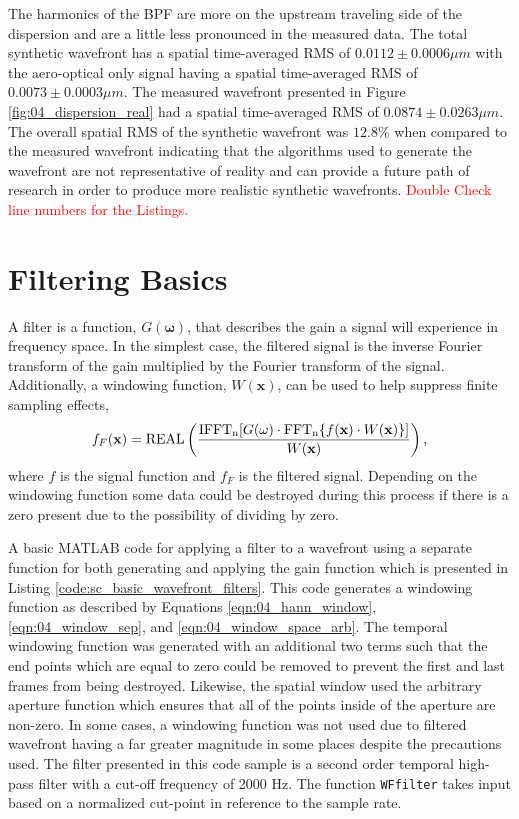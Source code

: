 The harmonics of the BPF are more on the upstream traveling side of the dispersion and are a little less pronounced in the measured data.
The total synthetic wavefront has a spatial time-averaged RMS of $0.0112\pm0.0006\mu m$ with the aero-optical only signal having a spatial time-averaged RMS of $0.0073\pm0.0003\mu m$.
The measured wavefront presented in Figure \ref{fig:04_dispersion_real} had a spatial time-averaged RMS of $0.0874\pm0.0263\mu m$.
The overall spatial RMS of the synthetic wavefront was $12.8\%$ when compared to the measured wavefront indicating that the algorithms used to generate the wavefront are not representative of reality and can provide a future path of research in order to produce more realistic synthetic wavefronts.
\textcolor{red}{Double Check line numbers for the Listings.}


\section{Filtering Basics}
A filter is a function, $G(\mathbf{\omega})$, that describes the gain a signal will experience in frequency space.
In the simplest case, the filtered signal is the inverse Fourier transform of the gain multiplied by the Fourier transform of the signal.
Additionally, a windowing function, $W(\mathbf{x})$, can be used to help suppress finite sampling effects,
\begin{equation}
 f_F(\mathbf{x}) = \operatorname{REAL}\left(\frac{\operatorname{IFFT_n}[G(\mathbf{\omega})\cdot\operatorname{FFT_n}\{f(\mathbf{x})\cdot W(\mathbf{x})\}]}{W(\mathbf{x})}\right) \textrm{,}
 \label{eqn:04_filter_function}
\end{equation}
where $f$ is the signal function and $f_F$ is the filtered signal.
Depending on the windowing function some data could be destroyed during this process if there is a zero present due to the possibility of dividing by zero.

A basic MATLAB code for applying a filter to a wavefront using a separate function for both generating and applying the gain function which is presented in Listing \ref{code:sc_basic_wavefront_filters}.
This code generates a windowing function as described by Equations \ref{eqn:04_hann_window}, \ref{eqn:04_window_sep}, and \ref{eqn:04_window_space_arb}.
The temporal windowing function was generated with an additional two terms such that the end points which are equal to zero could be removed to prevent the first and last frames from being destroyed.
Likewise, the spatial window used the arbitrary aperture function which ensures that all of the points inside of the aperture are non-zero.
In some cases, a windowing function was not used due to filtered wavefront having a far greater magnitude in some places despite the precautions used.
The filter presented in this code sample is a second order temporal high-pass filter with a cut-off frequency of 2000 Hz.
The function \lstinline{WFfilter} takes input based on a normalized cut-point in reference to the sample rate.

